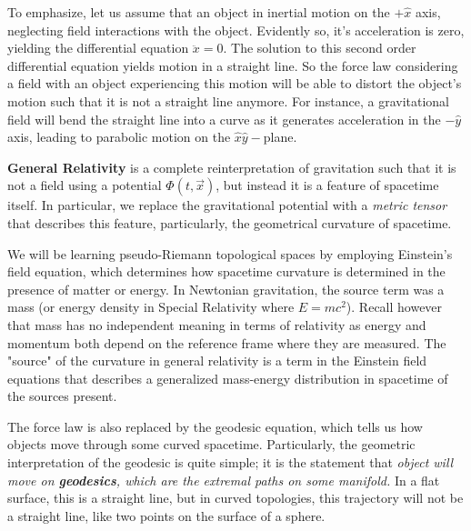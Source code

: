 \documentclass{article}
\begin{document}
 		To emphasize, let us assume that an object in inertial motion on the $+\hat{x}$ axis, neglecting field interactions with the object. Evidently so, it's acceleration is zero, yielding the differential equation $\ddot{x} = 0$. The solution to this second order differential equation yields motion in a straight line. So the force law considering a field with an object experiencing this motion will be able to distort the object's motion such that it is not a straight line anymore. For instance, a gravitational field will bend the straight line into a curve as it generates acceleration in the $-\hat{y}$ axis, leading to parabolic motion on the $\hat{x}\hat{y}-$plane.
 		
 		\begin{defn}
 			\textbf{General Relativity} is a complete reinterpretation of gravitation such that it is not a field using a potential $\Phi (t, \vec{x})$, but instead it is a feature of spacetime itself. In particular, we replace the gravitational potential with a \textit{metric tensor} that describes this feature, particularly, the geometrical curvature of spacetime.
 		\end{defn} 
 		We will be learning pseudo-Riemann topological spaces by employing Einstein's field equation, which determines how spacetime curvature is determined in the presence of matter or energy. In Newtonian gravitation, the source term was a mass (or energy density in Special Relativity where $E = mc^2$). Recall however that mass has no independent meaning in terms of relativity as energy and momentum both depend on the reference frame where they are measured. The "source" of the curvature in general relativity is a term in the Einstein field equations that describes a generalized mass-energy distribution in spacetime of the sources present.
 		
 		The force law is also replaced by the geodesic equation, which tells us how objects move through some curved spacetime. Particularly, the geometric interpretation of the geodesic is quite simple; it is the statement that \textit{object will move on \textbf{geodesics}, which are the extremal paths on some manifold.} In a flat surface, this is a straight line, but in curved topologies, this trajectory will not be a straight line, like two points on the surface of a sphere.
 		
\end{document}

